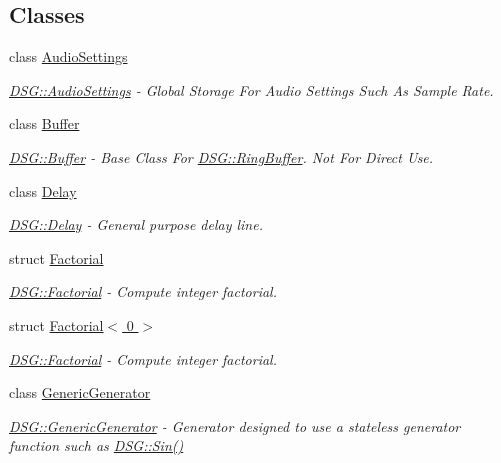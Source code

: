 \subsection*{Classes}
\begin{DoxyCompactItemize}
\item 
class \hyperlink{class_d_s_g_1_1_audio_settings}{Audio\+Settings}
\begin{DoxyCompactList}\small\item\em \hyperlink{class_d_s_g_1_1_audio_settings}{D\+S\+G\+::\+Audio\+Settings} -\/ Global Storage For Audio Settings Such As Sample Rate. \end{DoxyCompactList}\item 
class \hyperlink{class_d_s_g_1_1_buffer}{Buffer}
\begin{DoxyCompactList}\small\item\em \hyperlink{class_d_s_g_1_1_buffer}{D\+S\+G\+::\+Buffer} -\/ Base Class For \hyperlink{class_d_s_g_1_1_ring_buffer}{D\+S\+G\+::\+Ring\+Buffer}. Not For Direct Use. \end{DoxyCompactList}\item 
class \hyperlink{class_d_s_g_1_1_delay}{Delay}
\begin{DoxyCompactList}\small\item\em \hyperlink{class_d_s_g_1_1_delay}{D\+S\+G\+::\+Delay} -\/ General purpose delay line. \end{DoxyCompactList}\item 
struct \hyperlink{struct_d_s_g_1_1_factorial}{Factorial}
\begin{DoxyCompactList}\small\item\em \hyperlink{struct_d_s_g_1_1_factorial}{D\+S\+G\+::\+Factorial} -\/ Compute integer factorial. \end{DoxyCompactList}\item 
struct \hyperlink{struct_d_s_g_1_1_factorial_3_010_01_4}{Factorial$<$ 0 $>$}
\begin{DoxyCompactList}\small\item\em \hyperlink{struct_d_s_g_1_1_factorial}{D\+S\+G\+::\+Factorial} -\/ Compute integer factorial. \end{DoxyCompactList}\item 
class \hyperlink{class_d_s_g_1_1_generic_generator}{Generic\+Generator}
\begin{DoxyCompactList}\small\item\em \hyperlink{class_d_s_g_1_1_generic_generator}{D\+S\+G\+::\+Generic\+Generator} -\/ Generator designed to use a stateless generator function such as \hyperlink{namespace_d_s_g_aad63d316081c7d13a551acf346ee2749}{D\+S\+G\+::\+Sin()} \end{DoxyCompactList}\item 

\end{DoxyCompactItemize}
